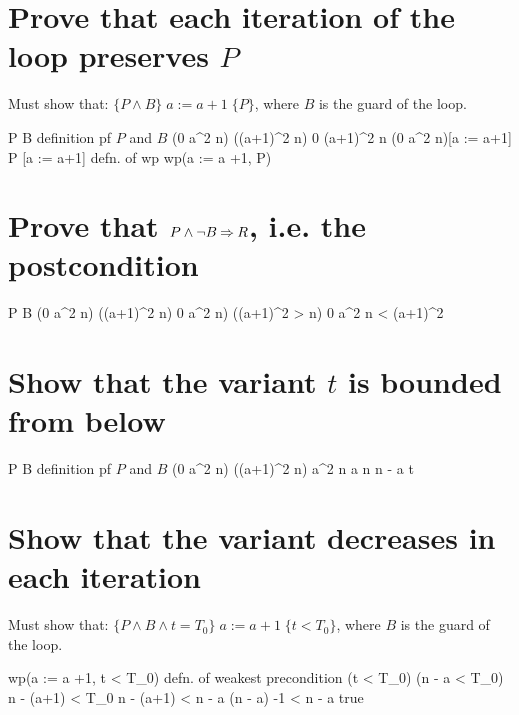 \documentclass[runningheads,12pt]{article}
\begin{document}
\section{Prove that each iteration of the loop preserves $P$}

Must show that: $\{P \land B\}\; a := a + 1 \;\{P\}$, where $B$ is the guard of the loop. 
	
\begin{calculation}
	P \land B
\hint{=} {definition pf $P$ and $B$}
	(0 \leq a^2 \leq n) \land ((a+1)^2 \leq n)
	0 \leq (a+1)^2 \leq n
	(0 \leq a^2 \leq n)[a := a+1]
	P [a := a+1]
\hint{=} {defn. of wp}
	wp(a := a +1, P)
\end{calculation}


\section{Prove that $P \land \lnot B \mathbin\Rightarrow R$, i.e. the postcondition} 
	
\begin{calculation}
	P \land \lnot B
	 (0 \leq a^2 \leq n) \land \lnot ((a+1)^2 \leq n)
	0 \leq a^2 \leq n) \land ((a+1)^2 > n)
	0 \leq a^2 \leq n < (a+1)^2
\end{calculation}


\section{Show that the variant $t$ is bounded from below}
 
\begin{calculation}
	P \land B
\hint{=} {definition pf $P$ and $B$}
	(0 \leq a^2 \leq n) \land ((a+1)^2 \leq n)
	a^2 \leq n
	a \leq \sqrt n
	\sqrt n - a \1
	t 
\end{calculation}

\section{Show that the variant decreases in each iteration}

Must show that: $\{P \land B \land t = T_0\}\; a := a + 1 \;\{t < T_0\}$, where $B$ is the guard of the loop. 

\begin{calculation}
	wp(a := a +1, t < T_0)
\hint{=} {defn. of weakest precondition}
	(t < T_0)\;[a := a+1]
	(\sqrt n - a < T_0)\;[a := a +1]
	\sqrt n - (a+1) < T_0
	\sqrt n - (a+1) < \sqrt n - a
	(\sqrt n - a) -1 < \sqrt n - a
	true
\end{calculation}
\end{document}

